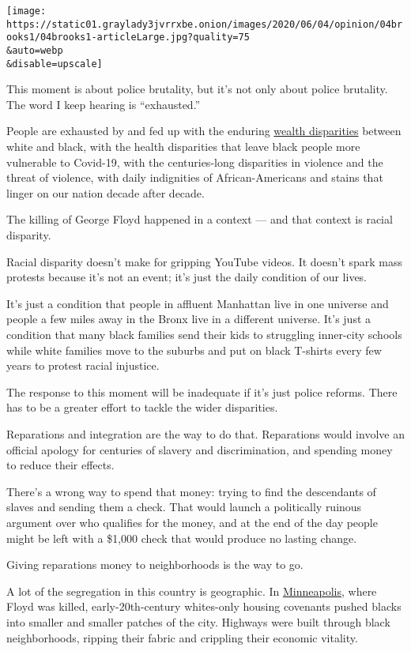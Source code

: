 \texttt{[image: https://static01.graylady3jvrrxbe.onion/images/2020/06/04/opinion/04brooks1/04brooks1-articleLarge.jpg?quality=75\\\&auto=webp\\\&disable=upscale]}

This moment is about police brutality, but it's not only about police
brutality. The word I keep hearing is ``exhausted.''

People are exhausted by and fed up with the enduring
\href{https://www.brookings.edu/blog/up-front/2020/02/27/examining-the-black-white-wealth-gap/}{wealth
disparities} between white and black, with the health disparities that
leave black people more vulnerable to Covid-19, with the centuries-long
disparities in violence and the threat of violence, with daily
indignities of African-Americans and stains that linger on our nation
decade after decade.

The killing of George Floyd happened in a context --- and that context
is racial disparity.

Racial disparity doesn't make for gripping YouTube videos. It doesn't
spark mass protests because it's not an event; it's just the daily
condition of our lives.

It's just a condition that people in affluent Manhattan live in one
universe and people a few miles away in the Bronx live in a different
universe. It's just a condition that many black families send their kids
to struggling inner-city schools while white families move to the
suburbs and put on black T-shirts every few years to protest racial
injustice.

The response to this moment will be inadequate if it's just police
reforms. There has to be a greater effort to tackle the wider
disparities.

Reparations and integration are the way to do that. Reparations would
involve an official apology for centuries of slavery and discrimination,
and spending money to reduce their effects.

There's a wrong way to spend that money: trying to find the descendants
of slaves and sending them a check. That would launch a politically
ruinous argument over who qualifies for the money, and at the end of the
day people might be left with a \$1,000 check that would produce no
lasting change.

Giving reparations money to neighborhoods is the way to go.

A lot of the segregation in this country is geographic. In
\href{https://www.washingtonpost.com/business/2020/05/30/minneapolis-racial-inequality/}{Minneapolis},
where Floyd was killed, early-20th-century whites-only housing covenants
pushed blacks into smaller and smaller patches of the city. Highways
were built through black neighborhoods, ripping their fabric and
crippling their economic vitality.

